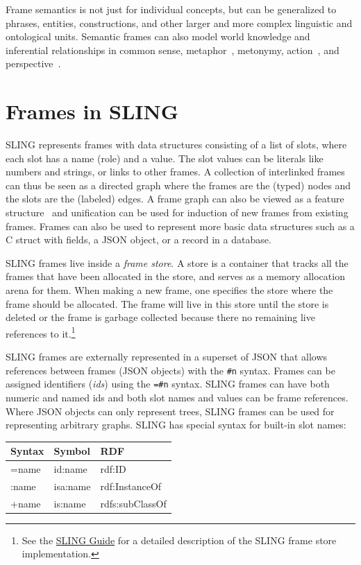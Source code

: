 \documentclass[11pt,a4paper]{article}
\begin{document}
Frame semantics is not just for individual concepts, but can be generalized
to phrases, entities, constructions, and other larger and more complex linguistic
and ontological units. Semantic frames can also model world knowledge and inferential relationships
in common sense,
metaphor~\cite{narayanan1999},
metonymy,
action~\cite{narayanan1999reasoning},
and perspective~\cite{chang2002}.

\section{Frames in SLING}
\label{sec:slingframes}

SLING represents frames with data structures consisting of a list of slots, where each
slot has a name (role) and a value. The slot values can be literals like numbers
and strings, or links to other frames. A collection of interlinked frames can thus be seen as a directed
graph where the frames are the (typed) nodes and the slots are the (labeled)
edges. A frame graph can also be viewed as a feature structure~\cite{carpenter2005}
and unification can be used for induction of new frames from existing frames.
Frames can also be used to represent more basic data
structures such as a C struct with fields, a JSON object, or a record in a
database.

SLING frames live inside a \emph{frame store}. A store is a container that
tracks all the frames that have been allocated in the store, and serves as a
memory allocation arena for them. When making a new frame, one
specifies the store where the frame should be allocated. The frame will live in
this store until the store is deleted or the frame is garbage collected because
there no remaining live references to it.\footnote{See the \href{https://github.com/google/sling/blob/master/frame/README.md}{SLING Guide}
for a detailed description of the SLING frame store implementation.}

SLING frames are externally represented in a superset of JSON that allows
references between frames (JSON objects) with the {\tt \#n} syntax. Frames can
be assigned identifiers (\emph{ids}) using the {\tt=\#n} syntax. SLING frames
can  have both numeric and named ids and both slot names and values can be frame
references. Where JSON objects can only represent trees, SLING frames can be
used for representing arbitrary graphs. SLING has special syntax for built-in
slot names:

\begin{table}[h!]
\begin{tabular}{|l|l|l|}
\hline
Syntax & Symbol & RDF \\
\hline
=name & id:name & rdf:ID \\
:name & isa:name & rdf:InstanceOf \\
+name & is:name & rdfs:subClassOf \\
\hline
\end{tabular}
\end{table}
\end{document}
